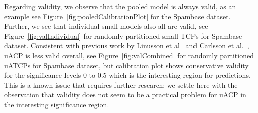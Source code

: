 \documentclass[main]{subfiles}
\begin{document}

Regarding validity, we observe that the pooled model is always valid, as an example see Figure~\ref{fig:pooledCalibrationPlot} for the Spambase dataset. Further, we see that individual small models also all are valid, see Figure~\ref{fig:valIndividual} for randomly partitioned small TCPs for Spambase dataset. Consistent with previous work by Linusson et al~\cite{Linusson:2017dn} and Carlsson et al.~\cite{Carlsson:2014qr}, uACP is less valid overall, see Figure~\ref{fig:valCombined} for randomly partitioned uATCPs for Spambase dataset, but calibration plot shows conservative validity for the significance levels 0 to 0.5 which is the interesting region for predictions. This is a known issue that requires further research; we settle here with the observation that validity does not seem to be a practical problem for uACP in the interesting significance region.
\end{document}

